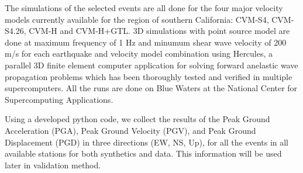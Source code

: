 

The simulations of the selected events are all done for the four major velocity models currently available for the region of southern California: CVM-S4, CVM-S4.26, CVM-H and CVM-H+GTL. 3D simulations with point source model are done at maximum frequency of 1 Hz and minumum shear wave velocity of 200 m/s for each earthquake and velocity model combination using Hercules, a parallel 3D finite element computer application for solving forward anelastic wave propagation problems which has been thoroughly tested and verified in multiple supercomputers. All the runs are done on Blue Waters at the National Center for Supercomputing Applications.

Using a developed python code, we collect the results of the Peak Ground Acceleration (PGA), Peak Ground Velocity (PGV), and Peak Ground Displacement (PGD) in three directions (EW, NS, Up), for all the events in all available stations for both synthetics and data. This information will be used later in validation method.

